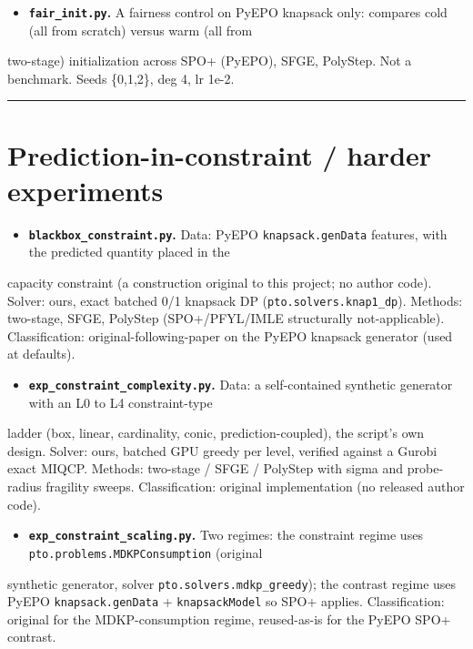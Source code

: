 \documentclass[10pt]{article}
\begin{document}
\begin{itemize}\setlength{\itemsep}{2pt}
\item \textbf{\texttt{fair\_init.py}.} A fairness control on PyEPO knapsack only: compares cold (all from scratch) versus warm (all from
\end{itemize}
  two-stage) initialization across SPO+ (PyEPO), SFGE, PolyStep. Not a benchmark. Seeds \{0,1,2\}, deg 4, lr 1e-2.

\medskip\hrule\medskip

\section*{Prediction-in-constraint / harder experiments}

\begin{itemize}\setlength{\itemsep}{2pt}
\item \textbf{\texttt{blackbox\_constraint.py}.} Data: PyEPO \texttt{knapsack.genData} features, with the predicted quantity placed in the
\end{itemize}
  capacity constraint (a construction original to this project; no author code). Solver: ours, exact batched 0/1
  knapsack DP (\texttt{pto.solvers.knap1\_dp}). Methods: two-stage, SFGE, PolyStep (SPO+/PFYL/IMLE structurally not-applicable).
  Classification: original-following-paper on the PyEPO knapsack generator (used at defaults).

\begin{itemize}\setlength{\itemsep}{2pt}
\item \textbf{\texttt{exp\_constraint\_complexity.py}.} Data: a self-contained synthetic generator with an L0 to L4 constraint-type
\end{itemize}
  ladder (box, linear, cardinality, conic, prediction-coupled), the script's own design. Solver: ours, batched GPU
  greedy per level, verified against a Gurobi exact MIQCP. Methods: two-stage / SFGE / PolyStep with sigma and
  probe-radius fragility sweeps. Classification: original implementation (no released author code).

\begin{itemize}\setlength{\itemsep}{2pt}
\item \textbf{\texttt{exp\_constraint\_scaling.py}.} Two regimes: the constraint regime uses \texttt{pto.problems.MDKPConsumption} (original
\end{itemize}
  synthetic generator, solver \texttt{pto.solvers.mdkp\_greedy}); the contrast regime uses PyEPO \texttt{knapsack.genData} +
  \texttt{knapsackModel} so SPO+ applies. Classification: original for the MDKP-consumption regime, reused-as-is for the PyEPO
  SPO+ contrast.
\end{document}
